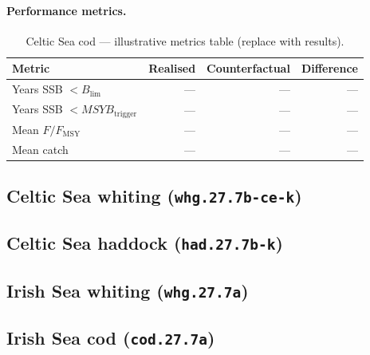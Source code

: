 \documentclass[11pt,a4paper]{extarticle}
\begin{document}

\paragraph{Performance metrics.}

\begin{table}[H]
\centering
\caption{Celtic Sea cod --- illustrative metrics table (replace with results).}
\label{tab:cod-metrics}
\begin{tabular}{@{}lrrr@{}}
\toprule
Metric & Realised & Counterfactual & Difference \\
\midrule
Years SSB $< B_{\lim}$ & --- & --- & --- \\
Years SSB $< MSYB_{\mathrm{trigger}}$ & --- & --- & --- \\
Mean $F/F_{\mathrm{MSY}}$ & --- & --- & --- \\
Mean catch & --- & --- & --- \\
\bottomrule
\end{tabular}
\end{table}

\subsection{Celtic Sea whiting (\texttt{whg.27.7b-ce-k})}
\label{sec:whg.27.7b-ce-k}

\subsection{Celtic Sea haddock (\texttt{had.27.7b-k})}
\label{sec:had.27.7b-k}

\subsection{Irish Sea whiting (\texttt{whg.27.7a})}
\label{sec:whg.27.7a}

\subsection{Irish Sea cod (\texttt{cod.27.7a})}
\label{sec:cod.27.7a}
\end{document}
